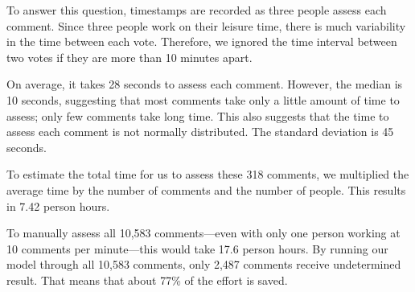 To answer this question, timestamps are recorded as three people assess each comment.
Since three people work on their leisure time, there is much variability in the time between each vote.
Therefore, we ignored the time interval between two votes if they are more than 10 minutes apart.

On average, it takes 28 seconds to assess each comment.
However, the median is 10 seconds, suggesting that most comments take only a little amount of time to assess; only few comments take long time.
This also suggests that the time to assess each comment is not normally distributed.
The standard deviation is 45 seconds.

To estimate the total time for us to assess these 318 comments,
we multiplied the average time by the number of comments and the number of people.
This results in 7.42 person hours.

To manually assess all 10,583 comments---even with only one person working at 10 comments per minute---this would take 17.6 person hours.
By running our model through all 10,583 comments, only 2,487 comments receive undetermined result.
That means that about 77\% of the effort is saved.

















